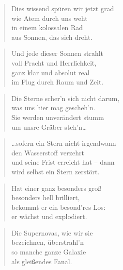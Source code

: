\documentclass[10pt,a4paper]{article}
\begin{document}
\begin{multicols}{2}
\begin{verse}
Dies wissend spüren wir jetzt grad \\
wie Atem durch uns weht \\
in einem kolossalen Rad \\
aus Sonnen, das sich dreht. \\
\end{verse}

\begin{verse}
Und jede dieser Sonnen strahlt \\
voll Pracht und Herrlichkeit, \\
ganz klar und absolut real \\
im Flug durch Raum und Zeit. \\
\end{verse}

\begin{verse}
Die Sterne scher’n sich nicht darum, \\
was uns hier mag gescheh’n. \\
Sie werden unverändert stumm \\
um unsre Gräber steh’n… \\
\end{verse}

\begin{verse}
…sofern ein Stern nicht irgendwann \\
den Wasserstoff verzehrt \\
und seine Frist erreicht hat – dann \\
wird selbst ein Stern zerstört. \\
\end{verse}

\begin{verse}
Hat einer ganz besonders groß \\
besonders hell brilliert, \\
bekommt er ein besond’res Los: \\
er wächst und explodiert. \\
\end{verse}

\begin{verse}
Die Supernovas, wie wir sie \\
bezeichnen, überstrahl’n \\
so manche ganze Galaxie \\
als gleißendes Fanal. \\
\end{verse}


\end{multicols}
\end{document}
